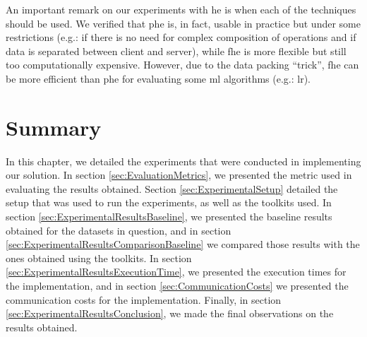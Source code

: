 An important remark on our experiments with \ac{he} is when each of the techniques should be used. We verified that \ac{phe} is, in fact, usable in practice but under some restrictions (e.g.: if there is no need for complex composition of operations and if data is separated between client and server), while \ac{fhe} is more flexible but still too computationally expensive. However, due to the data packing ``trick'', \ac{fhe} can be more efficient than \ac{phe} for evaluating some \ac{ml} algorithms (e.g.: \ac{lr}).





\section{Summary}
\label{sec:SummaryEvaluation}


In this chapter, we detailed the experiments that were conducted in implementing our solution. In section \ref{sec:EvaluationMetrics}, we presented the metric used in evaluating the results obtained.
Section \ref{sec:ExperimentalSetup} detailed the setup that was used to run the experiments, as well as the toolkits used.
In section \ref{sec:ExperimentalResultsBaseline}, we presented the baseline results obtained for the datasets in question, and in section \ref{sec:ExperimentalResultsComparisonBaseline} we compared those results with the ones obtained using the toolkits.
In section \ref{sec:ExperimentalResultsExecutionTime}, we presented the execution times for the implementation, and in section \ref{sec:CommunicationCosts} we presented the communication costs for the implementation.
Finally, in section \ref{sec:ExperimentalResultsConclusion}, we made the final observations on the results obtained.


